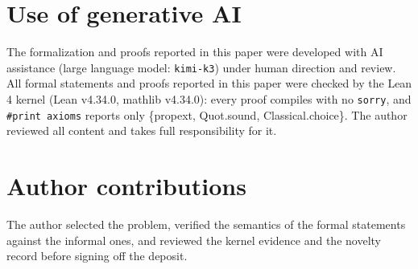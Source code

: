 \documentclass[11pt]{article}
\theoremstyle{definition}
\begin{document}
\section*{Use of generative AI}
The formalization and proofs reported in this paper were developed with AI
assistance (large language model: \texttt{kimi-k3}) under human direction and
review. All formal statements and proofs reported in this paper were checked by
the Lean 4 kernel (Lean v4.34.0, mathlib v4.34.0): every proof compiles with
no \texttt{sorry}, and \texttt{\#print axioms} reports only \{propext,
Quot.sound, Classical.choice\}. The author reviewed all content and takes full
responsibility for it.

\section*{Author contributions}
The author selected the problem, verified the semantics of the formal
statements against the informal ones, and reviewed the kernel evidence and the
novelty record before signing off the deposit.
\end{document}
